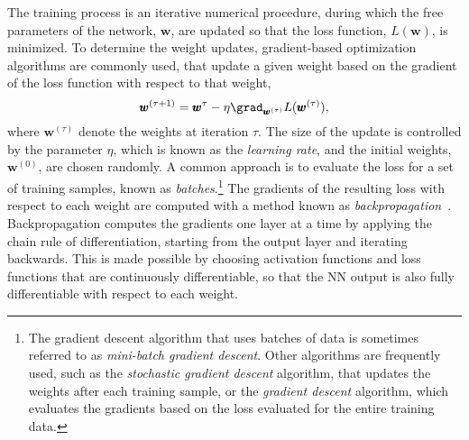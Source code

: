 The training process is an iterative numerical procedure, during which the free parameters of the network, $\pmb{w}$, are updated so that the loss function, $L(\pmb{w})$, is minimized. To determine the weight updates, gradient-based optimization algorithms are commonly used, that update a given weight based on the gradient of the loss function with respect to that weight, 
\begin{equation}
    \label{eq:gradient-descent}
    \pmb{w}^{(\tau+1)} = \pmb{w}^\tau - \eta \grad_{\pmb{w}^{(\tau)}} L(\pmb{w}^{(\tau)}),
\end{equation}
where $\pmb{w}^{(\tau)}$ denote the weights at iteration $\tau$.
The size of the update is controlled by the parameter $\eta$, which is known as the \emph{learning rate}, and the initial weights, $\pmb{w}^{(0)}$, are chosen randomly. A common approach is to evaluate the loss for a set of training samples, known as \emph{batches}.\footnote{The gradient descent algorithm that uses batches of data is sometimes referred to as \emph{mini-batch gradient descent}. Other algorithms are frequently used, such as the \emph{stochastic gradient descent} algorithm, that updates the weights after each training sample, or the \emph{gradient descent} algorithm, which evaluates the gradients based on the loss evaluated for the entire training data.} 
The gradients of the resulting loss with respect to each weight are computed with a method known as \emph{backpropagation}~\cite{Rumelhart_1986}. Backpropagation computes the gradients one layer at a time by applying the chain rule of differentiation, starting from the output layer and iterating backwards.
This is made possible by choosing activation functions and loss functions that are continuously differentiable, so that the NN output is also fully differentiable with respect to each weight.


